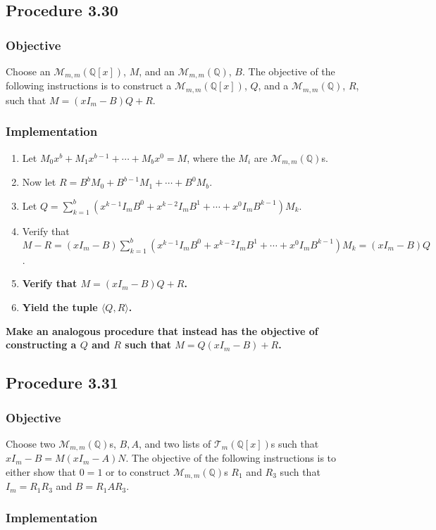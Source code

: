 \documentclass[twocolumn]{article}
\newcommand{\procedure}[2][]{\subsection*{Procedure #2 \ifthenelse{\equal{#1}{}}{}{(#1)}}\label{sec:procedure #2}}
\newcommand{\objective}{\subsubsection*{Objective}}
\newcommand{\implementation}{\subsubsection*{Implementation}}
\begin{document}
		\procedure{3.30}
			\objective
				Choose an $\mathcal{M}_{m,m}(\mathbb{Q}[x])$, $M$, and an $\mathcal{M}_{m,m}(\mathbb{Q})$, $B$. The objective of the following instructions is to construct a $\mathcal{M}_{m,m}(\mathbb{Q}[x])$, $Q$, and a $\mathcal{M}_{m,m}(\mathbb{Q})$, $R$, such that $M=(xI_m-B)Q+R$.
			\implementation
				\begin{enumerate}
					\item Let $M_0x^b+M_1x^{b-1}+\cdots+M_bx^0=M$, where the $M_i$ are $\mathcal{M}_{m,m}(\mathbb{Q})$s.
					\item Now let $R=B^bM_0+B^{b-1}M_1+\cdots+B^0M_b$.
					\item Let $Q=\sum_{k=1}^b (x^{k-1}I_mB^0+x^{k-2}I_mB^1+\cdots+x^0I_mB^{k-1})M_k$.
					\item Verify that $M-R=(xI_m-B)\sum_{k=1}^b (x^{k-1}I_mB^0+x^{k-2}I_mB^1+\cdots+x^0I_mB^{k-1})M_k=(xI_m-B)Q$.
					\item \textbf{Verify that $M=(xI_m-B)Q+R$.}
					\item \textbf{Yield the tuple $\langle Q,R\rangle$.}
				\end{enumerate}
			\textbf{Make an analogous procedure that instead has the objective of constructing a $Q$ and $R$ such that $M=Q(xI_m-B)+R$.}
		\procedure{3.31}
			\objective
				Choose two $\mathcal{M}_{m,m}(\mathbb{Q})$s, $B,A$, and two lists of $\mathcal{T}_{m}(\mathbb{Q}[x])$s such that $xI_m-B=M(xI_m-A)N$. The objective of the following instructions is to either show that $0=1$ or to construct $\mathcal{M}_{m,m}(\mathbb{Q})$s $R_1$ and $R_3$ such that $I_m=R_1R_3$ and $B=R_1AR_3$.
			\implementation
\end{document}
